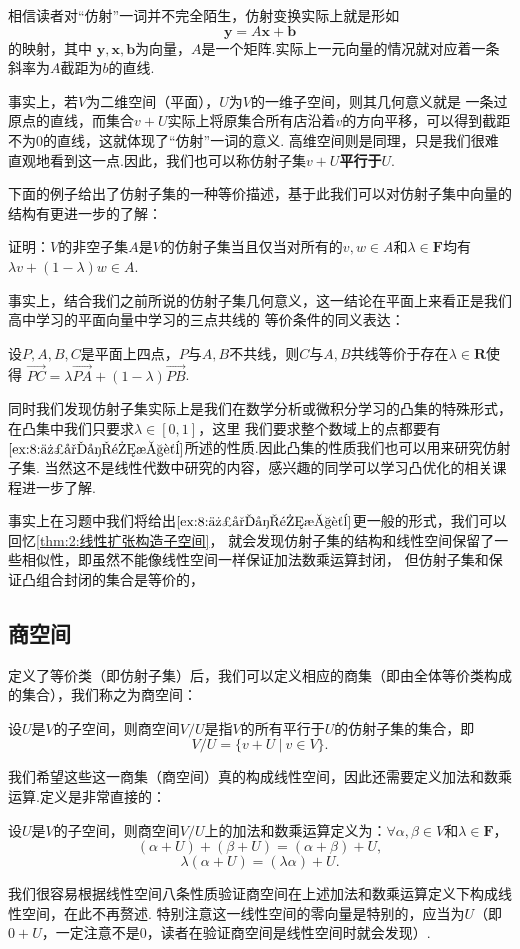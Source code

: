 相信读者对``仿射''一词并不完全陌生，仿射变换实际上就是形如\[\bm{y}=A\bm{x}+\bm{b}\]的映射，其中
$\bm{y,x,b}$为向量，$A$是一个矩阵.实际上一元向量的情况就对应着一条斜率为$A$截距为$b$的直线.

事实上，若$V$为二维空间（平面），$U$为$V$的一维子空间，则其几何意义就是
一条过原点的直线，而集合$v+U$实际上将原集合所有店沿着$v$的方向平移，可以得到截距不为0的直线，这就体现了``仿射''一词的意义.
高维空间则是同理，只是我们很难直观地看到这一点.因此，我们也可以称仿射子集$v+U$\textbf{平行于}$U$.

下面的例子给出了仿射子集的一种等价描述，基于此我们可以对仿射子集中向量的结构有更进一步的了解：
\begin{example}\label{ex:8:仿射子集性质}
	证明：$V$的非空子集$A$是$V$的仿射子集当且仅当对所有的$v,w\in A$和$\lambda\in\mathbf{F}$均有
	$\lambda v+(1-\lambda)w\in A$.
\end{example}
\begin{solution}

\end{solution}

事实上，结合我们之前所说的仿射子集几何意义，这一结论在平面上来看正是我们高中学习的平面向量中学习的三点共线的
等价条件的同义表达：
\begin{theorem}
    设$P,A,B,C$是平面上四点，$P$与$A,B$不共线，则$C$与$A,B$共线等价于存在$\lambda\in\mathbf{R}$使得
    $\overrightarrow{PC}=\lambda\overrightarrow{PA}+(1-\lambda)\overrightarrow{PB}$.
\end{theorem}
同时我们发现仿射子集实际上是我们在数学分析或微积分学习的凸集的特殊形式，在凸集中我们只要求$\lambda\in[0,1]$，这里
我们要求整个数域上的点都要有$\autoref{ex:8:仿射子集性质}$所述的性质.因此凸集的性质我们也可以用来研究仿射子集.
当然这不是线性代数中研究的内容，感兴趣的同学可以学习凸优化的相关课程进一步了解.

事实上在习题中我们将给出$\autoref{ex:8:仿射子集性质}$更一般的形式，我们可以回忆\autoref{thm:2:线性扩张构造子空间}，
就会发现仿射子集的结构和线性空间保留了一些相似性，即虽然不能像线性空间一样保证加法数乘运算封闭，
但仿射子集和保证凸组合封闭的集合是等价的，

\subsection{商空间}
定义了等价类（即仿射子集）后，我们可以定义相应的商集（即由全体等价类构成的集合），我们称之为商空间：
\begin{definition}
	设$U$是$V$的子空间，则商空间$V/U$是指$V$的所有平行于$U$的仿射子集的集合，即
	\[V/U=\{v+U\ |\ v\in V\}.\]
\end{definition}
我们希望这些这一商集（商空间）真的构成线性空间，因此还需要定义加法和数乘运算.定义是非常直接的：
\begin{definition}
	设$U$是$V$的子空间，则商空间$V/U$上的加法和数乘运算定义为：$\forall \alpha,\beta\in V$和$\lambda\in\mathbf{F}$，
	$$(\alpha+U)+(\beta+U)=(\alpha+\beta)+U,$$
	$$\lambda(\alpha+U)=(\lambda\alpha)+U.$$
\end{definition}
我们很容易根据线性空间八条性质验证商空间在上述加法和数乘运算定义下构成线性空间，在此不再赘述.
特别注意这一线性空间的零向量是特别的，应当为$U$（即$0+U$，一定注意不是$0$，读者在验证商空间是线性空间时就会发现）.

